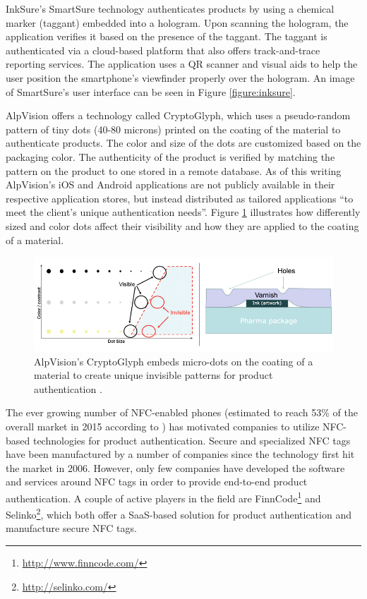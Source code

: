 \documentclass[thesis.tex]{subfiles}
\begin{document}
InkSure's SmartSure technology authenticates products by using a chemical marker (taggant) embedded into a hologram. Upon scanning the hologram, the application verifies it based on the presence of the taggant. The taggant is authenticated via a cloud-based platform that also offers track-and-trace reporting services. The application uses a QR scanner and visual aids to help the user position the smartphone's viewfinder properly over the hologram. \cite{inksure} An image of SmartSure's user interface can be seen in Figure \ref{figure:inksure}.

AlpVision offers a technology called CryptoGlyph\textregistered, which uses a pseudo-random pattern of tiny dots (40-80 microns) printed on the coating of the material to authenticate products. The color and size of the dots are customized based on the packaging color. The authenticity of the product is verified by matching the pattern on the product to one stored in a remote database. As of this writing AlpVision's iOS and Android applications are not publicly available in their respective application stores, but instead distributed as tailored applications ``to meet the client's unique authentication needs''. \cite{alpvision} Figure \ref{figure:alpvision} illustrates how differently sized and color dots affect their visibility and how they are applied to the coating of a material.

\begin{figure}[hb]
\centering \includegraphics[width=\textwidth]{images/existing_solutions/cryptoglyph}
\caption{AlpVision's CryptoGlyph\textregistered{} embeds micro-dots on the coating of a material to create unique invisible patterns for product authentication \cite{alpvision}. \label{figure:alpvision}}
\end{figure}

The ever growing number of NFC-enabled phones (estimated to reach 53\% of the overall market in 2015 according to \cite{frost-sullivan}) has motivated companies to utilize NFC-based technologies for product authentication. Secure and specialized NFC tags have been manufactured by a number of companies since the technology first hit the market in 2006. However, only few companies have developed the software and services around NFC tags in order to provide end-to-end product authentication. A couple of active players in the field are FinnCode\footnote{\url{http://www.finncode.com/}} and Selinko\footnote{\url{http://selinko.com/}}, which both offer a SaaS-based solution for product authentication and manufacture secure NFC tags.
\end{document}
